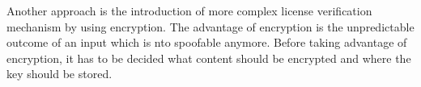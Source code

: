 Another approach is the introduction of more complex license verification mechanism by using encryption.
The advantage of encryption is the unpredictable outcome of an input which is nto spoofable anymore.
Before taking advantage of encryption, it has to be decided what content should be encrypted and where the key should be stored.
